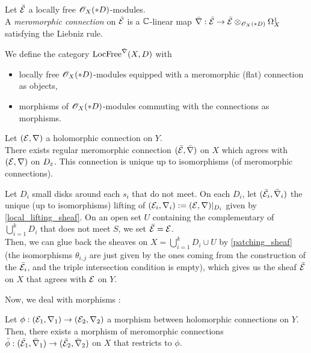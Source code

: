 \begin{mydef}
Let $\bar{\mathcal{E}}$ a locally free $\mathscr{O}_X(*D)$-modules.\\
A \textit{meromorphic connection} on $\bar{\mathcal{E}}$ is a $\mathbb{C}$-linear map $\bar{\nabla}:\bar{\mathcal{E}} \to \bar{\mathcal{E}} \otimes_{\mathscr{O}_X(*D)} \Omega^1_X$ satisfying the Liebniz rule.
\end{mydef}


\begin{mydef}
We define the category $\text{LocFree}^{\bar{\nabla}}(X,D)$ with
\begin{itemize}
\item locally free $\mathscr{O}_X(*D)$-modules equipped with a meromorphic (flat) connection as objects,
\item morphisms of $\mathscr{O}_X(*D)$-modules commuting with the connections as morphisms.
\end{itemize}
\end{mydef}


\begin{mytheo} \label{global_lifting_sheaf}
Let $(\mathcal{E},\nabla)$ a holomorphic connection on $Y$.\\
There exists regular meromorphic connection $(\bar{\mathcal{E}},\bar{\nabla})$ on $X$ which agrees with $(\mathcal{E},\nabla)$ on $D_\varepsilon$. This connection is unique up to isomorphisms (of meromorphic connections).
\end{mytheo}


\begin{mydemo}
Let $D_i$ small disks around each $s_i$ that do not meet. On each $D_i$, let $(\bar{\mathcal{E}}_i,\bar{\nabla}_i)$ the unique (up to isomorphisms) lifting of $(\mathcal{E}_i,\nabla_i) := (\mathcal{E},\nabla)|_{D_i}$ given by \ref{local_lifting_sheaf}. On an open set $U$ containing the complementary of $\bigcup_{i=1}^k D_i$ that does not meet $S$, we set $\bar{\mathcal{E}} = \mathcal{E}$.\\
 Then, we can glue back the sheaves on $X = \bigcup_{i=1}^k D_i \cup U$ by \ref{patching_sheaf} (the isomorphisms $\theta_{i,j}$ are just given by the ones coming from the construction of the $\bar{\mathcal{E}}_i$, and the triple intersection condition is empty), which gives us the sheaf $\bar{\mathcal{E}}$ on $X$ that agrees with $\mathcal{E}$ on $Y$.
\end{mydemo}


Now, we deal with morphisms :

\begin{myprop}
Let $\phi: (\mathcal{E}_1,\nabla_1) \to (\mathcal{E}_2,\nabla_2)$ a morphism between holomorphic connections on $Y$.\\
Then, there exists a morphism of meromorphic connections $\bar{\phi} : (\bar{\mathcal{E}}_1,\bar{\nabla}_1) \to (\bar{\mathcal{E}}_2,\bar{\nabla}_2)$ on $X$ that restricts to $\phi$.
\end{myprop}


